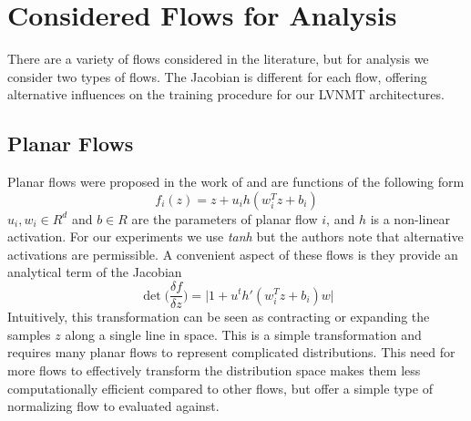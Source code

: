\section{Considered Flows for Analysis}

There are a variety of flows considered in the literature, but for analysis we consider two types of flows. The Jacobian is different for each flow, offering alternative influences on the training procedure for our \ac{LVNMT} architectures. 

\subsection{Planar Flows}

Planar flows were proposed in the work of \citet{rezende2015VIwithNF} and are functions of the following form
\begin{equation}
f_{i}(z) = z + u_{i} h(w_{i}^{T} z + b_{i})
\end{equation}
$u_{i}, w_{i} \in R^{d}$ and $b \in R$ are the parameters of planar flow $i$, and $h$ is a non-linear activation. For our experiments we use \textit{tanh} but the authors note that alternative activations are permissible. A convenient aspect of these flows is they provide an analytical term of the Jacobian
\begin{equation}
\det \bigg( \frac{\delta f}{\delta z} \bigg) = \bigg| 1 + u^{t} h'(w_{i}^{T} z + b_{i})w \bigg|
\end{equation} 
Intuitively, this transformation can be seen as contracting or expanding the samples $z$ along a single line in space. This is a simple transformation and requires many planar flows to represent complicated distributions. This need for more flows to effectively transform the distribution space makes them less computationally efficient compared to other flows, but offer a simple type of normalizing flow to evaluated against.  %





